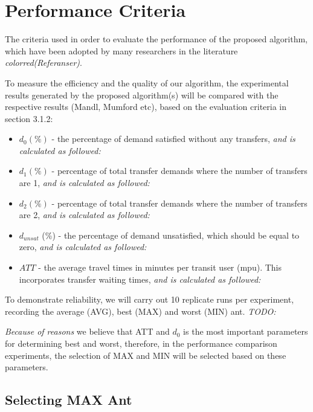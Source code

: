 \section{Performance Criteria}

The criteria used in order to evaluate the performance of the proposed algorithm, which have been adopted by many researchers in the literature \emph{color{red}(Referanser)}.

To measure the efficiency and the quality of our algorithm, the experimental results generated by the proposed algorithm(s) will be compared with the respective results (Mandl, Mumford etc), based on the evaluation criteria in section 3.1.2: 

\begin{itemize}
\item $d_0 (\%)$ - the percentage of demand satisfied without any transfers, \emph{\color{red}and is calculated as followed:}
\item $d_1 (\%)$ - percentage of total transfer demands where the number of transfers are 1, \emph{\color{red}and is calculated as followed:}
\item $d_2 (\%)$ - percentage of total transfer demands where the number of transfers are 2, \emph{\color{red}and is calculated as followed:}
\item $d_{unsat}$ (\%) - the percentage of demand unsatisfied, which should be equal to zero, \emph{\color{red}and is calculated as followed:}
\item $ATT$  - the average travel times in minutes per transit user (mpu). This incorporates transfer waiting times, \emph{\color{red}and is calculated as followed:}
\end{itemize}

To demonstrate reliability, we will carry out 10 replicate runs per experiment, recording the average (AVG), best (MAX) and worst (MIN) ant.  
\emph{\color{red} TODO:}

\emph{\color{red} Because of reasons }we believe that ATT and $d_0$ is the most important parameters for determining best and worst, therefore, in the performance comparison experiments, the selection of MAX and MIN will be selected based on these parameters.

\subsection{Selecting MAX Ant}

